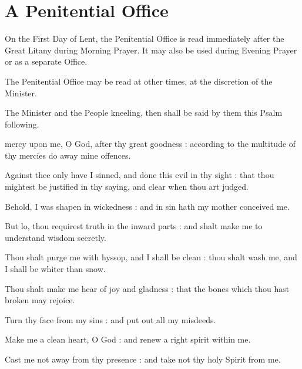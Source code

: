 \label{penitential}
\fancyhead[RE,LO]{}
\section{A Penitential Office}
\begin{secrubric}
	On the First Day of Lent, the Penitential Office is read immediately after the Great Litany during Morning Prayer. It may also be used during Evening Prayer or as a separate Office.
\end{secrubric}
\begin{secrubric}
    The Penitential Office may be read at other times, at the discretion of the Minister.
\end{secrubric}
\begin{secrubric}
    The Minister and the People kneeling, then shall be said by them this Psalm following.
\end{secrubric}
 mercy upon me, O God, after thy great goodness : according to the multitude of thy mercies do away mine offences.\par
{}
Against thee only have I sinned, and done this evil in thy sight : that thou mightest be justified in thy saying, and clear when thou art judged.\par
{}Behold, I was shapen in wickedness : and in sin hath my mother conceived me.\par
{}But lo, thou requirest truth in the inward parts : and shalt make me to understand wisdom secretly.\par
{}Thou shalt purge me with hyssop, and I shall be clean : thou shalt wash me, and I shall be whiter than snow.\par
{}Thou shalt make me hear of joy and gladness : that the bones which thou hast broken may rejoice.\par
{}Turn thy face from my sins : and put out all my misdeeds.\par
{}Make me a clean heart, O God : and renew a right spirit within me.\par
{}Cast me not away from thy presence : and take not thy holy Spirit from me.\par
